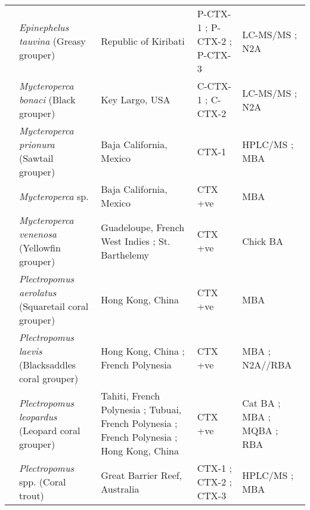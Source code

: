 \documentclass[12pt]{article}
\begin{document}
\begin{longtable}[l]{ | p{2cm} | p{3cm} | p{4.5cm} | p{2cm} | p{3cm} | }
	& \emph{Epinephelus tauvina} (Greasy grouper) & Republic of Kiribati \cite{mak2013pacific} & P-CTX-1 \cite{mak2013pacific}; P-CTX-2 \cite{mak2013pacific}; P-CTX-3 \cite{mak2013pacific} & LC-MS/MS \cite{mak2013pacific}; N2A \cite{mak2013pacific} \\
	& \emph{Mycteroperca bonaci} (Black grouper) & Key Largo, USA \cite{dickey2008ciguatera} & C-CTX-1 \cite{dickey2008ciguatera}; C-CTX-2 \cite{dickey2008ciguatera} & LC-MS/MS \cite{dickey2008ciguatera}; N2A \cite{dickey2008ciguatera} \\
	& \emph{Mycteroperca prionura} (Sawtail grouper) & Baja California, Mexico \cite{sierra1998overview} & CTX-1 \cite{sierra1998overview} & HPLC/MS \cite{sierra1998overview}; MBA \cite{sierra1998overview} \\
	& \emph{Mycteroperca} sp. & Baja California, Mexico \cite{lechuga1995documented} & CTX +ve \cite{lechuga1995documented} & MBA \cite{lechuga1995documented} \\
	& \emph{Mycteroperca venenosa} (Yellowfin grouper) & Guadeloupe, French West Indies \cite{pottier2001ciguatera}; St. Barthelemy \cite{pottier2001ciguatera} & CTX +ve \cite{pottier2001ciguatera} & Chick BA \cite{pottier2001ciguatera}\\
	& \emph{Plectropomus aerolatus} (Squaretail coral grouper) & Hong Kong, China \cite{wong2005study} & CTX +ve \cite{wong2005study} & MBA \cite{wong2005study} \\
	& \emph{Plectropomus laevis} (Blacksaddles coral grouper) & Hong Kong, China \cite{wong2008features}; French Polynesia \cite{chinain2014mail} & CTX +ve \cite{wong2008features,chinain2014mail} &  MBA \cite{wong2008features}; N2A//RBA \cite{chinain2014mail}\\
	& \emph{Plectropomus leopardus} (Leopard coral grouper) & Tahiti, French Polynesia \cite{pompon1983ciguatera}; Tubuai, French Polynesia \cite{darius2007ciguatera}; French Polynesia \cite{bagnis1987use}; Hong Kong, China \cite{wong2005study} & CTX +ve \cite{wong2005study,darius2007ciguatera,bagnis1987use,pompon1983ciguatera} & Cat BA \cite{bagnis1987use}; MBA \cite{wong2005study,bagnis1987use,pompon1983ciguatera}; MQBA \cite{bagnis1987use}; RBA \cite{darius2007ciguatera} \\
	& \emph{Plectropomus} spp. (Coral trout) & Great Barrier Reef, Australia \cite{lewis1992multiple} & CTX-1 \cite{lewis1992multiple}; CTX-2 \cite{lewis1992multiple}; CTX-3 \cite{lewis1992multiple} & HPLC/MS \cite{lewis1992multiple}; MBA \cite{lewis1992multiple} \\

\end{longtable}
\end{document}
